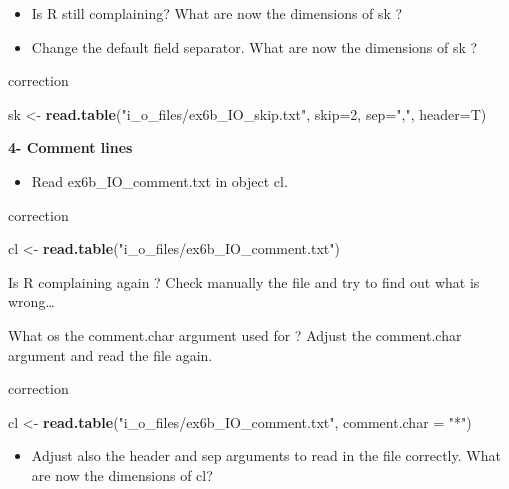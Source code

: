 \documentclass[]{book}
\newenvironment{Shaded}{\begin{snugshade}}{\end{snugshade}}
\newcommand{\DataTypeTok}[1]{\textcolor[rgb]{0.13,0.29,0.53}{#1}}
\newcommand{\DecValTok}[1]{\textcolor[rgb]{0.00,0.00,0.81}{#1}}
\newcommand{\KeywordTok}[1]{\textcolor[rgb]{0.13,0.29,0.53}{\textbf{#1}}}
\newcommand{\NormalTok}[1]{#1}
\newcommand{\StringTok}[1]{\textcolor[rgb]{0.31,0.60,0.02}{#1}}
\providecommand{\tightlist}{%
  \setlength{\itemsep}{0pt}\setlength{\parskip}{0pt}}
\begin{document}
\begin{itemize}
\item
  Is R still complaining?
  What are now the dimensions of sk ?
\item
  Change the default field separator.
  What are now the dimensions of sk ?
\end{itemize}

correction

\begin{Shaded}
\begin{Highlighting}[]
\NormalTok{sk <-}\StringTok{ }\KeywordTok{read.table}\NormalTok{(}\StringTok{"i_o_files/ex6b_IO_skip.txt"}\NormalTok{,}
                 \DataTypeTok{skip=}\DecValTok{2}\NormalTok{,}
                 \DataTypeTok{sep=}\StringTok{","}\NormalTok{,}
                 \DataTypeTok{header=}\NormalTok{T)}
\end{Highlighting}
\end{Shaded}

\textbf{4- Comment lines}

\begin{itemize}
\tightlist
\item
  Read ex6b\_IO\_comment.txt in object cl.
\end{itemize}

correction

\begin{Shaded}
\begin{Highlighting}[]
\NormalTok{cl <-}\StringTok{ }\KeywordTok{read.table}\NormalTok{(}\StringTok{"i_o_files/ex6b_IO_comment.txt"}\NormalTok{)}
\end{Highlighting}
\end{Shaded}

Is R complaining again ? Check manually the file and try to find out what is wrong\ldots{}

What os the comment.char argument used for ? Adjust the comment.char argument and read the file again.

correction

\begin{Shaded}
\begin{Highlighting}[]
\NormalTok{cl <-}\StringTok{ }\KeywordTok{read.table}\NormalTok{(}\StringTok{"i_o_files/ex6b_IO_comment.txt"}\NormalTok{,}
                 \DataTypeTok{comment.char =} \StringTok{"*"}\NormalTok{)}
\end{Highlighting}
\end{Shaded}

\begin{itemize}
\tightlist
\item
  Adjust also the header and sep arguments to read in the file correctly.
  What are now the dimensions of cl?
\end{itemize}
\end{document}
